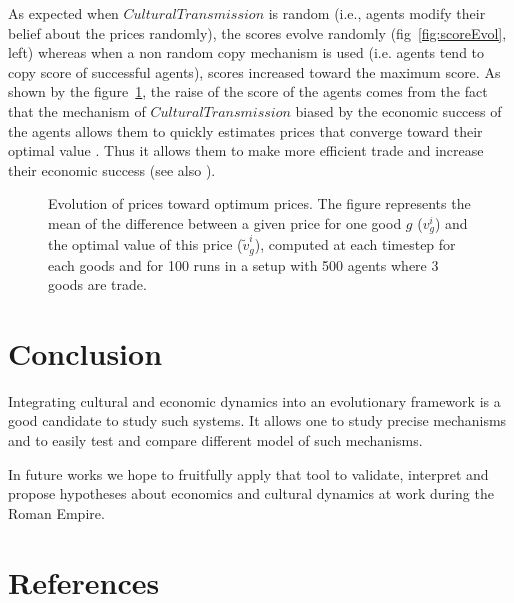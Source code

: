 \documentclass{article}
\begin{document}
As expected when $CulturalTransmission$ is random (i.e., agents modify their belief about the prices randomly), the scores evolve randomly (fig~\ref{fig:scoreEvol}, left) whereas when a non random copy mechanism is used (i.e. agents tend to copy score of successful agents), scores increased toward the maximum score.
\vfil
As shown by the figure~\ref{fig:ratioEvol}, the raise of the score of the agents comes from the fact that the mechanism of $CulturalTransmission$ biased by the economic success of the agents allows them to quickly estimates prices that converge toward their optimal value . Thus it allows them to make more efficient trade and increase their economic success (see also \cite{gintis_emergence_2006}).
\vspace{-.3cm}
\begin{figure}[H]
	\begin{center}
	\end{center}
	\caption{
	    \small
	    Evolution of prices toward optimum prices. The figure represents the mean of the difference between a given price for one good $g$ ($v^i_g$) and the optimal value of this price ($\tilde{v}^i_g$), computed at each timestep for each goods and for 100 runs in a setup with 500 agents where 3 goods are trade.
	}
	\label{fig:ratioEvol}
\end{figure}



\section{Conclusion}
	Integrating cultural and economic dynamics into an evolutionary framework is a good candidate to study such systems. It allows one to study precise mechanisms and to easily test and compare different model of such mechanisms.
	
	In future works we hope to fruitfully apply that tool to validate, interpret and propose hypotheses about economics and cultural dynamics at work during the Roman Empire.


\section{References}
	\scriptsize
	\renewcommand{\refname}{\vspace{-0.5em}}
	
	
\end{document}
